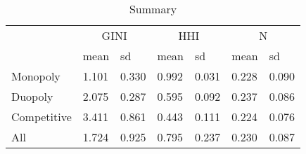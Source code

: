 \begin{table}
	\caption{Summary}
	\centering
	\begin{tabular}[t]{lllllll}\toprule
	\multicolumn{1}{c}{ } & \multicolumn{2}{c}{GINI} & \multicolumn{2}{c}{HHI} & \multicolumn{2}{c}{N} \\\cmidrule(l{3pt}r{3pt}){2-3}  \cmidrule(l{3pt}r{3pt}){4-5} \cmidrule(l{3pt}r{3pt}){6-7}  & mean & sd & mean  & sd  & mean   & sd  \\
  \midrule
	Monopoly & 1.101 & 0.330 & 0.992 & 0.031 & 0.228 & 0.090\\
  Duopoly & 2.075 & 0.287 & 0.595 & 0.092 & 0.237 & 0.086\\
  Competitive & 3.411 & 0.861 & 0.443 & 0.111 & 0.224 & 0.076\\
  All & 1.724 & 0.925 & 0.795 & 0.237 & 0.230 & 0.087\\
  \bottomrule
	\end{tabular}
\end{table}
